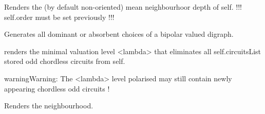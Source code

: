 \documentclass[letterpaper,10pt,english]{sphinxmanual}
\begin{document}
\begin{fulllineitems}
\begin{fulllineitems}
\end{fulllineitems}


\begin{fulllineitems}
\label{techDoc:digraphs.Digraph.meanLength}
Renders the (by default non-oriented) mean neighbourhoor depth of self.
!!! self.order must be set previously !!!

\end{fulllineitems}


\begin{fulllineitems}
\label{techDoc:digraphs.Digraph.minimalChoices}
Generates all dominant or absorbent choices of a bipolar
valued digraph.

\end{fulllineitems}


\begin{fulllineitems}
\label{techDoc:digraphs.Digraph.minimalValuationLevelForCircuitsElimination}
renders the minimal valuation level \textless{}lambda\textgreater{} that eliminates all
self.circuitsList stored odd chordless circuits from self.

\begin{notice}{warning}{Warning:}
The \textless{}lambda\textgreater{} level polarised may still contain newly appearing chordless odd circuits !
\end{notice}

\end{fulllineitems}


\begin{fulllineitems}
\label{techDoc:digraphs.Digraph.neighbourhoodCollection}
Renders the neighbourhood.

\end{fulllineitems}


\end{fulllineitems}
\end{document}
